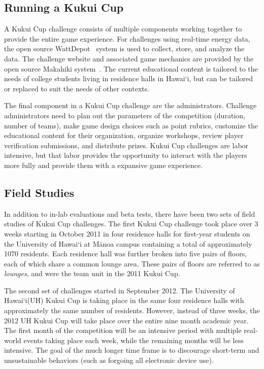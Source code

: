 \documentclass{sigchi}
\newcommand{\Hawaii}{Hawai`i\xspace}
\newcommand{\Manoa}{M\=anoa\xspace}
\begin{document}
\subsection{Running a Kukui Cup}

A Kukui Cup challenge consists of multiple components working together to provide the entire game experience. For challenges using real-time energy data, the open source WattDepot~\cite{csdl2-10-05} system is used to collect, store, and analyze the data. The challenge website and associated game mechanics are provided by the open source Makahiki system~\cite{csdl2-11-07}. The current educational content is tailored to the needs of college students living in residence halls in \Hawaii, but can be tailored or replaced to suit the needs of other contexts.

The final component in a Kukui Cup challenge are the administrators. Challenge administrators need to plan out the parameters of the competition (duration, number of teams), make game design choices such as point rubrics, customize the educational content for their organization, organize workshops, review player verification submissions, and distribute prizes. Kukui Cup challenges are labor intensive, but that labor provides the opportunity to interact with the players more fully and provide them with a expansive game experience.

\subsection{Field Studies}

In addition to in-lab evaluations and beta tests, there have been two sets of field studies of Kukui Cup challenges. The first Kukui Cup challenge took place over 3 weeks starting in October 2011 in four residence halls for first-year students on the University of \Hawaii at \Manoa campus containing a total of approximately 1070 residents. Each residence hall was further broken into five pairs of floors, each of which share a common lounge area. These pairs of floors are referred to as \emph{lounges}, and were the team unit in the 2011 Kukui Cup.

The second set of challenges started in September 2012. The University of \Hawaii (UH) Kukui Cup is taking place in the same four residence halls with approximately the same number of residents. However, instead of three weeks, the 2012 UH Kukui Cup will take place over the entire nine month academic year. The first month of the competition will be an intensive period with multiple real-world events taking place each week, while the remaining months will be less intensive. The goal of the much longer time frame is to discourage short-term and unsustainable behaviors (such as forgoing all electronic device use). 
\end{document}
